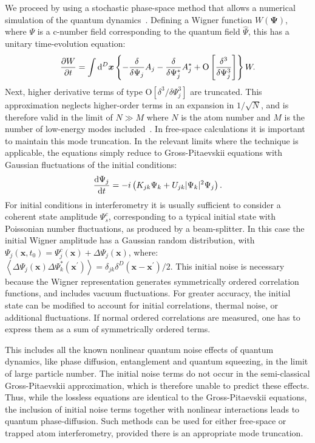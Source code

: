 \documentclass[doublecol]{epl2}
\newcommand{\xvec}{\boldsymbol{x}}
\newcommand{\Psivec}{\boldsymbol{\Psi}}
\begin{document}
We proceed by using a stochastic phase-space method that allows a numerical
simulation of the quantum dynamics~\cite{Drummond1993,Steel1998,Hoffmann2008}.
Defining a Wigner function $W(\Psivec)$, where $\Psi$
is a c-number field corresponding to the quantum field $\hat{\Psi}$, this has a unitary time-evolution equation:
\begin{equation}
	\frac{\partial W}{\partial t} = \int \upd^D\xvec \left\{
		- \frac{\delta}{\delta\Psi_j} A_j
		- \frac{\delta}{\delta\Psi_j^*}A_j^*
		+ \mbox{O} \left[ \frac{\delta^3}{\delta\Psi_j^3} \right]
	\right\} W.
\end{equation}
Next, higher derivative terms of type $\mbox{O} \left[ \delta^3 / \delta\Psi_j^3 \right]$ are truncated.
This approximation neglects higher-order terms in an expansion in $1 / \sqrt{N}$,
and is therefore valid in the limit of $N \gg M$
where $N$ is the atom number and $M$ is the number of low-energy modes included~\cite{Drummond1993,Sinatra2002,Norrie2006}.
In free-space calculations it is important to maintain this mode truncation.
In the relevant limits where the technique is applicable, the equations
simply reduce to Gross-Pitaevskii equations with Gaussian fluctuations
of the initial conditions:
\begin{equation}
\label{eqn:SDE-1}
	\frac{\mathrm{d}\Psi_j}{\mathrm{d} t} = -i \left(
		K_{jk} \Psi_k + U_{jk} \lvert \Psi_k \rvert^2 \Psi_j
	\right).
\end{equation}
For initial conditions in interferometry it is usually sufficient to consider
a coherent state amplitude $\Psi_s^c$,
corresponding to a typical initial state with Poissonian number fluctuations,
as produced by a beam-splitter.
In this case the initial Wigner amplitude has a Gaussian random distribution, with
$\Psi_j(\xvec, t_0) = \Psi_j^c(\xvec) + \Delta \Psi_j(\xvec)$, where:
$\left\langle \Delta \Psi_j(\xvec) \Delta \Psi_k^*(\xvec^{\prime}) \right\rangle =
\delta_{jk} \delta^D(\xvec - \xvec^{\prime}) / 2.$
This initial noise is necessary because the Wigner representation generates
symmetrically ordered correlation functions, and includes vacuum fluctuations.
For greater accuracy, the initial state can be modified to account for
initial  correlations, thermal noise, or additional fluctuations.
If normal ordered correlations are measured, one has to express them
as a sum of symmetrically ordered terms.

This includes all the known nonlinear quantum noise effects of quantum dynamics,
like phase diffusion, entanglement and quantum squeezing, in the limit
of large particle number.
The initial noise terms do not occur in the semi-classical Gross-Pitaevskii
approximation, which is therefore unable to predict these effects.
Thus, while the lossless equations are identical to the Gross-Pitaevskii
equations, the inclusion of initial noise terms together with nonlinear
interactions leads to quantum phase-diffusion.
Such methods can be used for either free-space or trapped atom interferometry,
provided there is an appropriate mode truncation.
\end{document}
